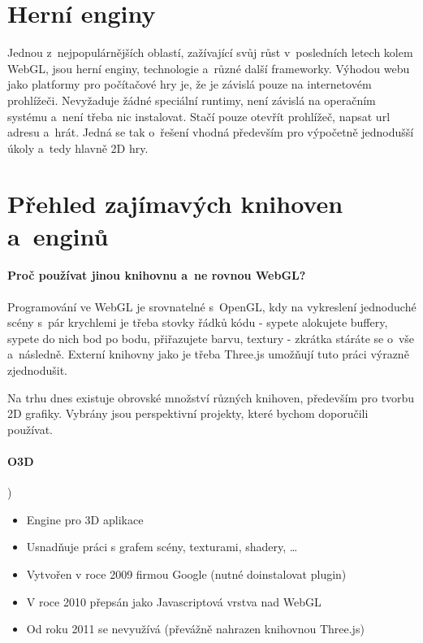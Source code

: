 \documentclass[12pt,a4paper,titlepage,final]{report}
\begin{document}
\section{Herní enginy}

Jednou z~nejpopulárnějších oblastí, zažívající svůj růst v~posledních letech kolem WebGL, jsou herní enginy, technologie a~různé další frameworky. Výhodou webu jako platformy pro počítačové hry je, že je závislá pouze na internetovém prohlížeči. Nevyžaduje žádné speciální runtimy, není závislá na operačním systému a~není třeba nic instalovat. Stačí pouze otevřít prohlížeč, napsat url adresu a~hrát. Jedná se tak o~řešení vhodná především pro výpočetně jednodušší úkoly a~tedy 
hlavně 2D hry.

\section{Přehled zajímavých knihoven a~enginů}

\paragraph{Proč používat jinou knihovnu a~ne rovnou WebGL?} Programování ve WebGL je srovnatelné s~OpenGL, kdy na vykreslení jednoduché scény s~pár krychlemi je třeba stovky řádků kódu - sypete alokujete buffery, sypete do nich bod po bodu, přiřazujete barvu, textury - zkrátka stáráte se o~vše a~následně. Externí knihovny jako je třeba Three.js umožňují tuto práci výrazně zjednodušit.

Na trhu dnes existuje obrovské množství různých knihoven, především pro tvorbu 2D grafiky. Vybrány jsou perspektivní projekty, které bychom doporučili používat.

\paragraph{O3D})

\begin{itemize}
	\item Engine pro 3D aplikace
	\item Usnadňuje práci s grafem scény, texturami, shadery, \dots	
	\item Vytvořen v roce 2009 firmou Google (nutné doinstalovat plugin)
	\item V roce 2010 přepsán jako Javascriptová vrstva nad WebGL
	\item Od roku 2011 se nevyužívá (převážně nahrazen knihovnou Three.js)
\end{itemize}
\end{document}
